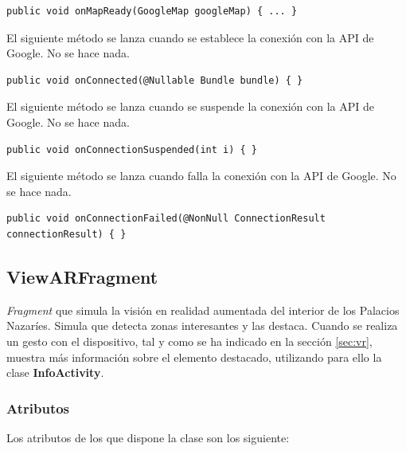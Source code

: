 \documentclass[11pt,a4paper]{article}
\begin{document}
\begin{lstlisting}
public void onMapReady(GoogleMap googleMap) { ... }
\end{lstlisting}

El siguiente método se lanza cuando se establece la conexión con la API de Google. No se hace nada.

\begin{lstlisting}
public void onConnected(@Nullable Bundle bundle) { }
\end{lstlisting}

El siguiente método se lanza cuando se suspende la conexión con la API de Google. No se hace nada.

\begin{lstlisting}
public void onConnectionSuspended(int i) { }
\end{lstlisting}

El siguiente método se lanza cuando falla la conexión con la API de Google. No se hace nada.

\begin{lstlisting}
public void onConnectionFailed(@NonNull ConnectionResult connectionResult) { }
\end{lstlisting}

\subsection{\textbf{ViewARFragment}}
\label{sec:view}

\textit{Fragment} que simula la visión en realidad aumentada del interior de los Palacios
Nazaríes. Simula que detecta zonas interesantes y las destaca. Cuando se realiza un gesto con el dispositivo, tal y como se
ha indicado en la sección \ref{sec:vr}, muestra más información sobre el elemento destacado, utilizando para ello la clase
\textbf{InfoActivity}.

\subsubsection{Atributos}

Los atributos de los que dispone la clase son los siguiente:
\end{document}

